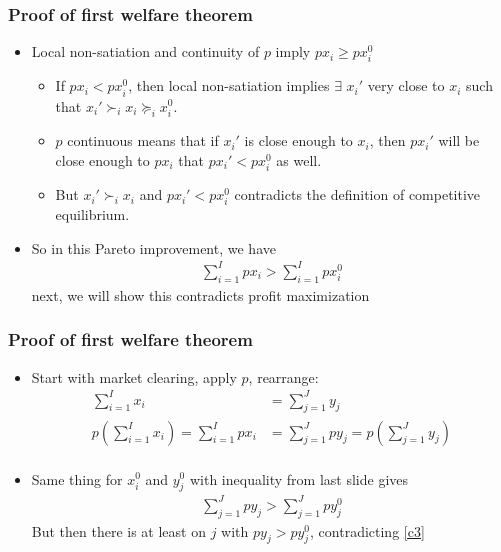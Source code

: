 \documentclass[compress]{beamer}
\newcommand{\prefeq}{\succeq}
\newcommand{\pref}{\succ}
\begin{document}
\begin{frame}
  \frametitle{Proof of first welfare theorem}
  \begin{itemize}
  \item Local non-satiation and continuity of $p$ imply $p x_i
    \geq p x_i^0$  
    \begin{itemize}
    \item If $p x_i < p x_i^0$, then local non-satiation implies
      $\exists$ $x_i'$ very close to $x_i$ such that $x_i' \pref_i x_i
      \prefeq_i x_i^0$. 
    \item $p$ continuous means that if $x_i'$ is close enough to
      $x_i$, then $p x_i'$ will be close enough to $p x_i$ that 
      $p x_i' < p x_i^0$ as well. 
    \item But $x_i' \pref_i x_i$ and $p x_i' < p x_i^0$ contradicts
      the definition of competitive equilibrium.
    \end{itemize}
  \item So in this Pareto improvement, we have
    \begin{align}
     \sum_{i=1}^I p x_i > \sum_{i=1}^I p x_i^0
    \end{align}
    next, we will show this contradicts profit maximization
  \end{itemize}
\end{frame}

\begin{frame}
  \frametitle{Proof of first welfare theorem}
  \begin{itemize}
  \item Start with market clearing, apply $p$, rearrange:
    \begin{align}
      \sum_{i=1}^I x_i & = \sum_{j=1}^J y_j  \\
      p(\sum_{i=1}^I x_i) =  \sum_{i=1}^I p x_i & 
      = \sum_{j=1}^J p y_j  = p(\sum_{j=1}^J y_j)  \\ 
    \end{align}
  \item Same thing for $x_i^0$ and $y_j^0$ with inequality from last
    slide gives
    \begin{align}
      \sum_{j=1}^J p y_j > \sum_{j=1}^J p y_j^0 
    \end{align}
    But then there is at least on $j$ with $p y_j > p y_j^0$,
    contradicting \ref{c3}
  \end{itemize}  
\end{frame}
\end{document}
